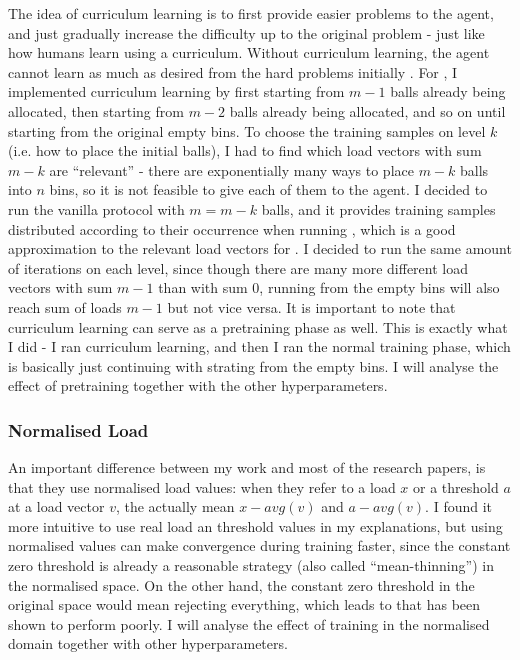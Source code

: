 The idea of curriculum learning \cite{bengio2009curriculumoriginal} is to first provide easier problems to the agent, and just gradually increase the difficulty up to the original problem - just like how humans learn using a curriculum. Without curriculum learning, the agent cannot learn as much as desired from the hard problems initially . For \TwoThinning, I implemented curriculum learning by first starting from $m-1$ balls already being allocated, then starting from $m-2$ balls already being allocated, and so on until starting from the original empty bins. To choose the training samples on level $k$ (i.e. how to place the initial balls), I had to find which load vectors with sum $m-k$ are ``relevant'' - there are exponentially many ways to place $m-k$ balls into $n$ bins, so it is not feasible to give each of them to the agent. I decided to run the vanilla \OneChoice{} protocol with $m=m-k$ balls, and it provides training samples distributed according to their occurrence when running \OneChoice, which is a good approximation to the relevant load vectors for \TwoThinning. I decided to run the same amount of iterations on each level, since though there are many more different load vectors with sum $m-1$ than with sum $0$, running from the empty bins will also reach sum of loads $m-1$ but not vice versa. It is important to note that curriculum learning can serve as a pretraining phase as well. This is exactly what I did - I ran curriculum learning, and then I ran the normal training phase, which is basically just continuing with strating from the empty bins. I will analyse the effect of pretraining together with the other hyperparameters.




\subsubsection{Normalised Load}


An important difference between my work and most of the research papers, is that they use normalised load values: when they refer to a load $x$ or a threshold $a$ at a load vector $v$, the actually mean $x-avg(v)$ and $a-avg(v)$. I found it more intuitive to use real load an threshold values in my explanations, but using normalised values can make convergence during training faster, since the constant zero threshold is already a reasonable strategy (also called ``mean-thinning'') in the normalised space. On the other hand, the constant zero threshold in the original space would mean rejecting everything, which leads to \OneChoice that has been shown to perform poorly. I will analyse the effect of training in the normalised domain together with other hyperparameters.


